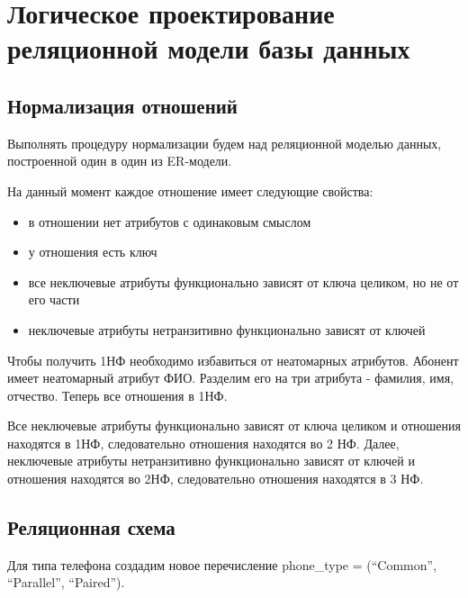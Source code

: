 \documentclass{report}
\begin{document}
\chapter{Логическое проектирование реляционной модели базы данных}

\section{Нормализация отношений}

Выполнять процедуру нормализации будем над реляционной моделью 
данных, построенной один в один из ER-модели. 

На данный момент 
каждое отношение имеет следующие свойства:
\begin{itemize}
    \item в отношении нет атрибутов с одинаковым смыслом
    \item у отношения есть ключ
    \item все неключевые атрибуты функционально зависят от ключа целиком, но не от его части
    \item неключевые атрибуты нетранзитивно функционально зависят от ключей
\end{itemize} 
Чтобы получить 1НФ необходимо избавиться от неатомарных атрибутов. 
Абонент имеет неатомарный атрибут ФИО. Разделим его на три атрибута - 
фамилия, имя, отчество. Теперь все отношения в 1НФ.

Все неключевые атрибуты функционально зависят от ключа целиком и отношения
находятся в 1НФ, следовательно отношения находятся во 2 НФ. Далее, неключевые 
атрибуты нетранзитивно функционально зависят от ключей и отношения находятся
во 2НФ, следовательно отношения находятся в 3 НФ.

\section{Реляционная схема}

Для типа телефона создадим новое перечисление phone\_type =
(``Common'', ``Parallel'', ``Paired'').
\end{document}
